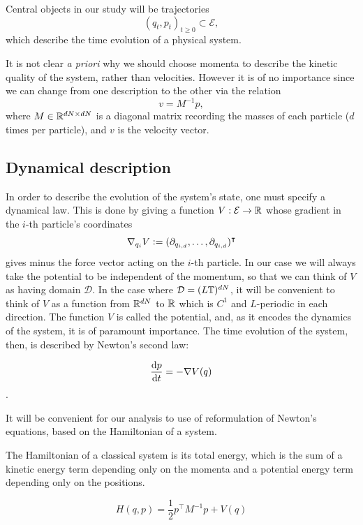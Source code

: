 Central objects in our study will be trajectories 
$$(q_t,p_t)_{t\geq 0} \subset \mathcal E,$$
which describe the time evolution of a physical system.

It is not clear \textit{a priori} why we should choose momenta to describe the kinetic quality of the system, rather than velocities. However it is of no importance since we can change from one description to the other via the relation
$$v=M^{-1}p,$$
where $M\in \mathbb{R}^{dN \times dN}$ is a diagonal matrix recording the masses of each particle ($d$ times per particle), and $v$ is the velocity vector.

\subsection{Dynamical description}

In order to describe the evolution of the system's state, one must specify a dynamical law. This is done by giving a function
$V: \mathcal E \to \mathbb{R}$ whose gradient in the $i$-th particle's coordinates 
$$ \nabla_{q_i} V \mathrel{\mathop:}= (\partial_{q_{i,d}},\dots , \partial_{q_{i,d}})^\intercal $$
gives minus the force vector acting on the $i$-th particle. In our case we will always take the potential to be independent of the momentum, so that we can think of $V$ as having domain $\mathcal D$. In the case where $\mathcal{D} = (L\mathbb T)^{dN}$, it will be convenient to think of $V$ as a function from $\mathbb{R}^{dN}$ to $\mathbb{R}$ which is $C^1$ and $L$-periodic in each direction.
The function $V$ is called the potential, and, as it encodes the dynamics of the system, it is of paramount importance. The time evolution of the system, then, is described by Newton's second law:

$$\frac{\text{d} p}{\mathrm{d}t}=-\nabla V(q)$$.

It will be convenient for our analysis to use of reformulation of Newton's equations, based on the Hamiltonian of a system.

\begin{definition}[Hamiltonian]
    The Hamiltonian of a classical system is its total energy, which is the sum of a kinetic energy term depending only on the momenta and a potential energy term depending only on the positions.

    \begin{equation}
        \label{eq:hamiltonian}
        H(q,p)=\frac12p^\intercal M^{-1}p+V(q)
    \end{equation}
\end{definition}

